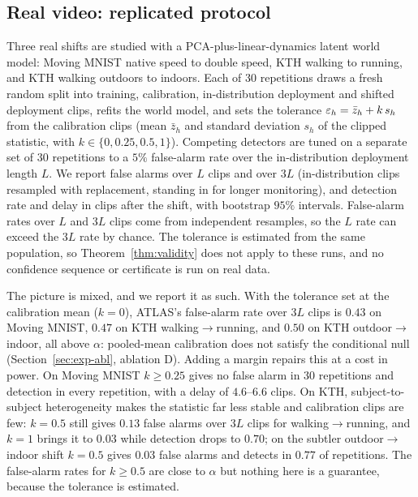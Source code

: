 \subsection{Real video: replicated protocol}\label{sec:exp-real}

Three real shifts are studied with a PCA-plus-linear-dynamics latent world model: Moving MNIST \citep{srivastava2015movingmnist} native speed to double speed, KTH \citep{schuldt2004kth} walking to running, and KTH walking outdoors to indoors. Each
of 30 repetitions draws a fresh random split into training, calibration, in-distribution deployment and shifted deployment clips, refits the world model, and sets the tolerance $\varepsilon_h=\bar z_h+k\,s_h$ from the calibration clips (mean $\bar z_h$ and standard deviation $s_h$ of the clipped statistic, with $k\in\{0,0.25,0.5,1\}$).
Competing detectors are tuned on a separate set of 30 repetitions to a $5\%$ false-alarm rate over the in-distribution deployment length $L$. We report false alarms over $L$ clips and over $3L$ (in-distribution clips resampled with replacement, standing in for longer monitoring), and detection rate and delay in clips after the shift, with bootstrap $95\%$ intervals. False-alarm rates over $L$ and $3L$ clips come from independent resamples, so the $L$ rate can exceed the $3L$ rate by chance. The tolerance is estimated from the same population, so Theorem~\ref{thm:validity} does not apply to these runs, and no confidence sequence or certificate is run on real data.



The picture is mixed, and we report it as such. With the tolerance set at the calibration mean ($k=0$), ATLAS's false-alarm rate over $3L$ clips is $0.43$ on Moving MNIST, $0.47$ on KTH walking$\to$running, and
$0.50$ on KTH outdoor$\to$indoor, all above $\alpha$: pooled-mean calibration does not satisfy the conditional null (Section~\ref{sec:exp-abl}, ablation D). Adding a margin repairs this at a cost in power. On Moving MNIST $k\ge0.25$ gives no false alarm in 30 repetitions
and detection in every repetition, with a delay of $4.6$--$6.6$ clips. On KTH, subject-to-subject heterogeneity makes the statistic far less stable and calibration clips are few: $k=0.5$ still gives $0.13$ false alarms over $3L$ clips for walking$\to$running, and
$k=1$ brings it to $0.03$ while detection drops to $0.70$; on the subtler outdoor$\to$indoor shift $k=0.5$ gives $0.03$ false alarms and detects in $0.77$ of repetitions. The false-alarm rates for $k\ge0.5$ are close to $\alpha$ but nothing here is
a guarantee, because the tolerance is estimated.

